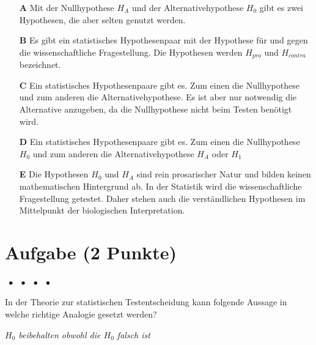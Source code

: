 \documentclass[a4paper, 9pt]{scrartcl}\usepackage[]{graphicx}\usepackage[]{xcolor}
\begin{document}
\begin{enumerate}
\item [\textbf{A} \msquare] Mit der Nullhypothese $H_A$ und der Alternativehypothese $H_0$ gibt es zwei Hypothesen, die aber selten genutzt werden.
\item [\textbf{B} \msquare] Es gibt ein statistisches Hypothesenpaar mit der Hypothese für und gegen die wissenschaftliche Fragestellung. Die Hypothesen werden $H_{pro}$ und $H_{contra}$ bezeichnet.
\item [\textbf{C} \msquare] Ein statistisches Hypothesenpaare gibt es. Zum einen die Nullhypothese und zum anderen die Alternativehypothese. Es ist aber nur notwendig die Alternative anzugeben, da die Nullhypothese nicht beim Testen benötigt wird.
\item [\textbf{D} \msquare] Ein statistisches Hypothesenpaare gibt es. Zum einen die Nullhypothese $H_0$ und zum anderen die Alternativehypothese $H_A$ oder $H_1$
\item [\textbf{E} \msquare] Die Hypothesen $H_0$ und $H_A$ sind rein prosarischer Natur und bilden keinen mathematischen Hintergrund ab. In der Statistik wird die wissenschaftliche Fragestellung getestet. Daher stehen auch die verständlichen Hypothesen im Mittelpunkt der biologischen Interpretation.
\end{enumerate}

\section{Aufgabe \hfill (2 Punkte)}

\ifcollection
\begin{flushright}
\tiny\vspace{-2Ex}
\textbf{\examinhaltstart}
\exammodulemathstat $\;\bullet$
\exammodulestat $\;\bullet$
\exammodulestatbbv $\;\bullet$
\exammodulestatversuch $\;\bullet$
\exammodulebiostat
\vspace{-1Ex}
\end{flushright}
\fi




In der Theorie zur statistischen Testentscheidung kann folgende Aussage
in welche richtige Analogie gesetzt werden?

\begin{center}
\textit{$H_0$ beibehalten obwohl die $H_0$ falsch ist}
\end{center}
\end{document}
